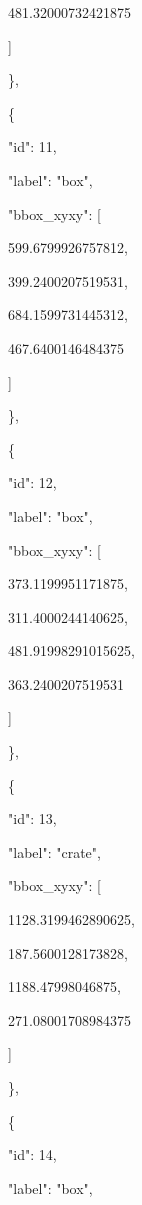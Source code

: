 \documentclass[10pt,a4paper]{article}
\begin{document}
        481.32000732421875\par
      ]\par
    \},\allowbreak{}\par
    \{\par
      "id":\allowbreak{} 11,\allowbreak{}\par
      "label":\allowbreak{} "box",\allowbreak{}\par
      "bbox\_xyxy":\allowbreak{} [\par
        599.6799926757812,\allowbreak{}\par
        399.2400207519531,\allowbreak{}\par
        684.1599731445312,\allowbreak{}\par
        467.6400146484375\par
      ]\par
    \},\allowbreak{}\par
    \{\par
      "id":\allowbreak{} 12,\allowbreak{}\par
      "label":\allowbreak{} "box",\allowbreak{}\par
      "bbox\_xyxy":\allowbreak{} [\par
        373.1199951171875,\allowbreak{}\par
        311.4000244140625,\allowbreak{}\par
        481.91998291015625,\allowbreak{}\par
        363.2400207519531\par
      ]\par
    \},\allowbreak{}\par
    \{\par
      "id":\allowbreak{} 13,\allowbreak{}\par
      "label":\allowbreak{} "crate",\allowbreak{}\par
      "bbox\_xyxy":\allowbreak{} [\par
        1128.3199462890625,\allowbreak{}\par
        187.5600128173828,\allowbreak{}\par
        1188.47998046875,\allowbreak{}\par
        271.08001708984375\par
      ]\par
    \},\allowbreak{}\par
    \{\par
      "id":\allowbreak{} 14,\allowbreak{}\par
      "label":\allowbreak{} "box",\allowbreak{}\par
\end{document}
